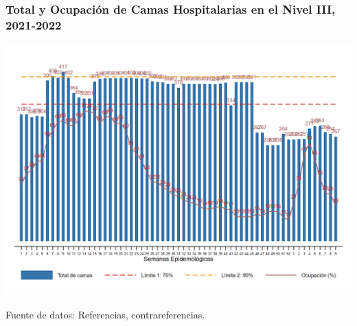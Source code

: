 \documentclass[xcolor=table]{beamer}
\begin{document}
	\begin{frame}
		\frametitle{Total y Ocupación de Camas Hospitalarias en el Nivel III, 2021-2022}
		\vspace{-.5cm}
		\begin{center}
			\includegraphics[width=0.8\linewidth, trim={0cm .5cm 0cm 0.2cm},clip]{../figuras/nivel_3.png}
		\end{center}
		{\tiny Fuente de datos: Referencias, contrareferencias.}
	\end{frame}
\end{document}

